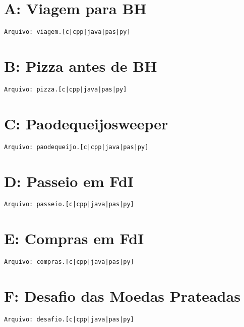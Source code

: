 \documentclass[12pt,oneside]{article} %
\begin{document}
\newpage

\clearpage
\section*{A: Viagem para BH} %
\vspace{-0.52cm}
\noindent \begin{verbatim}Arquivo: viagem.[c|cpp|java|pas|py]\end{verbatim}


\clearpage
\section*{B: Pizza antes de BH} %
\vspace{-0.52cm}
\noindent \begin{verbatim}Arquivo: pizza.[c|cpp|java|pas|py]\end{verbatim}


\clearpage
\section*{C: Paodequeijosweeper} %
\vspace{-0.52cm}
\noindent \begin{verbatim}Arquivo: paodequeijo.[c|cpp|java|pas|py]\end{verbatim}


\clearpage
\section*{D: Passeio em FdI} %
\vspace{-0.52cm}
\noindent \begin{verbatim}Arquivo: passeio.[c|cpp|java|pas|py]\end{verbatim}


\clearpage
\section*{E: Compras em FdI} %
\vspace{-0.52cm}
\noindent \begin{verbatim}Arquivo: compras.[c|cpp|java|pas|py]\end{verbatim}


\clearpage
\section*{F: Desafio das Moedas Prateadas} %
\vspace{-0.52cm}
\noindent \begin{verbatim}Arquivo: desafio.[c|cpp|java|pas|py]\end{verbatim}

\end{document}
